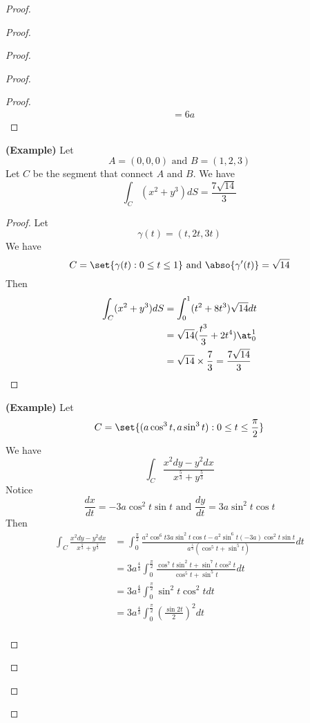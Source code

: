 \documentclass{report}
\begin{document}
\begin{proof}
\begin{proof}
\begin{proof}
\begin{proof}
\begin{proof}
\begin{align}
&=6a
\end{align}
\end{proof}
\begin{theorem}
\label{9.1.6}
\textbf{(Example)} Let 
\begin{equation}
A=(0,0,0)\text{ and }B=(1,2,3)
\end{equation}
Let $C$ be the segment that connect  $A$ and  $B$. We have
\begin{equation}
\int_C (x^2+y^3)dS=\frac{7\sqrt{14} }{3}
\end{equation}
\end{theorem}
\begin{proof}
Let 
\begin{equation}
\gamma (t)=(t,2t,3t)
\end{equation}
We have
\begin{equation}
C=\set{\gamma (t):0\leq t\leq 1}\text{ and }\abso{\gamma '(t)}=\sqrt{14} 
\end{equation}
Then
\begin{align}
\int_C (x^2+y^3)dS&=\int_0^1 (t^2+8t^3)\sqrt{14}dt\\
&=\sqrt{14}(\frac{t^3}{3}+2t^4) \at_{0}^1\\
&=\sqrt{14} \times \frac{7}{3} =\frac{7\sqrt{14} }{3}
\end{align}
\end{proof}
\begin{theorem}
\label{9.1.7}
\textbf{(Example)} Let
\begin{equation}
C=\set{(a\cos^3 t,a\sin^3 t):0\leq t\leq \frac{\pi}{2}}
\end{equation}
We have
\begin{equation}
\int_C \frac{x^2dy-y^2dx }{x^{\frac{5}{3}}+y^{\frac{5}{3}}}
\end{equation}
Notice
\begin{equation}
\frac{dx}{dt}=-3a\cos^2 t \sin t\text{ and }\frac{dy}{dt}=3a\sin^2 t\cos t
\end{equation}
Then
\begin{align}
  \int_C \frac{x^2dy-y^2dx}{x^{\frac{5}{3}}+y^{\frac{5}{3}}}&=\int_0^{\frac{\pi}{2}}\frac{a^2\cos^6 t 3a \sin^2 t \cos t-a^2 \sin^6 t (-3a)\cos ^2 t \sin t}{a^{\frac{5}{3}}(\cos^5 t+\sin^5 t)}dt\\
  &=3a^{\frac{4}{3}}\int_0^{\frac{\pi}{2}} \frac{\cos^7 t \sin^2 t+ \sin^7 t \cos^2 t}{\cos^5 t+ \sin^5 t}dt\\
  &=3a^{\frac{4}{3}}\int_0^{\frac{\pi}{2}}\sin^2 t \cos^2 t dt\\
  &=3a^{\frac{4}{3}}\int_0^{\frac{\pi}{2}} (\frac{\sin 2t}{2})^2 dt\\

\end{align}
\end{theorem}
\end{proof}
\end{proof}
\end{proof}
\end{proof}
\end{document}
